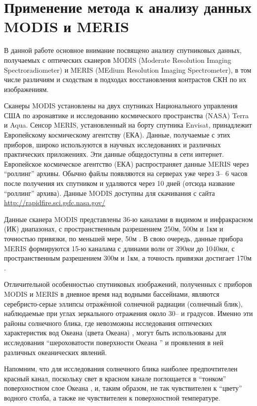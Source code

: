 \newpage

\section{Применение метода к анализу данных MODIS и MERIS} \label{sec:1.4}



В данной работе основное внимание посвящено анализу спутниковых данных, получаемых с оптических сканеров MODIS (Moderate Resolution Imaging Spectroradiometer) и MERIS (MEdium Resolution Imaging Spectrometer), в том числе различиям и сходствам в подходах восстановления контрастов СКН по их изображениям. 

Сканеры MODIS установлены на двух спутниках Национального управления США по аэронавтике и исследованию космического пространства (NASA) Terra и Aqua. Сенсор MERIS, установленный на борту спутника Envisat, принадлежит Европейскому космическому агентству (ЕКА). Данные, получаемые с этих приборов, широко используются в научных исследованиях и различных практических приложениях. Эти данные общедоступны в сети интернет. Европейское космическое агентство (ЕКА) распространяет данные MERIS через ``роллинг'' архивы. Обычно файлы появляются на серверах уже через 3-- 6 часов после получения их спутником и удаляются через 10 дней (отсюда название ``роллинг'' архива). Данные MODIS доступны для скачивания с сайта \url{http://rapidfire.sci.gsfc.nasa.gov/}

Данные сканера MODIS представлены 36-ю каналами в видимом и инфракрасном (ИК) диапазонах, с пространственным разрешением 250м, 500м и 1км и точностью привязки, по меньшей мере, 50м \citep{Salomonson1989, Wolfe2002}. В свою очередь, данные прибора MERIS формируются 15-ю каналама с длинами волн от 390\textit{нм} до 1040\textit{нм}, с пространственным разрешением 300м и 1км, а точность привязки достигает 170м \citep{Goryl2004}.

Отличительной особенностью спутниковых изображений, полученных с приборов MODIS и MERIS в дневное время над водными бассейнами, являются серебристо-серые эллипсы отражённой солнечной радиации (солнечный блик), наблюдаемые при углах зеркального отражения около 30-- и градусов. Именно эти районы солнечного блика, где невозможны исследования оптических характеристик вод Океана (цвета Океана) \citep{Esaias1998}, могут быть использованы для исследования ``шероховатости поверхности Океана '' и проявления в ней различных океанических явлений. 

Напомним, что для исследования солнечного блика наиболее предпочтителен красный канал, поскольку свет в красном канале поглощается в ``тонком'' поверхностном слое Океана \citep{Jerlov1976}, и, таким образом, не так чувствителен к ``цвету'' водного столба, а также не чувствителен к поверхностной температуре.

